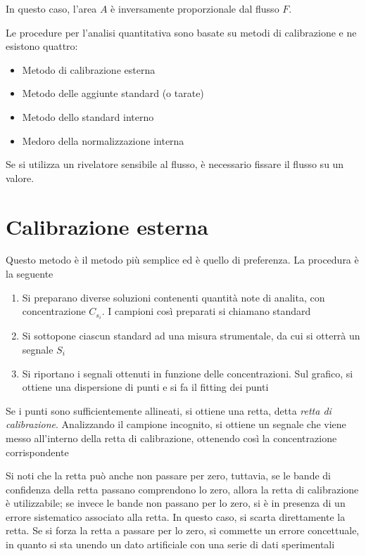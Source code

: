 In questo caso, l'area $A$ è inversamente proporzionale dal flusso $F$.

Le procedure per l'analisi quantitativa sono basate su metodi di calibrazione e ne esistono quattro:
\begin{itemize}
\item Metodo di calibrazione esterna
\item Metodo delle aggiunte standard (o tarate)
\item Metodo dello standard interno
\item Medoro della normalizzazione interna
\end{itemize}
Se si utilizza un rivelatore sensibile al flusso, è necessario fissare il flusso su un valore.

\section{Calibrazione esterna}
Questo metodo è il metodo più semplice ed è quello di preferenza. La procedura è la seguente
\begin{enumerate}
\item Si preparano diverse soluzioni contenenti quantità note di analita, con concentrazione $C_{s_i}$. I campioni così preparati si chiamano standard
\item Si sottopone ciascun standard ad una misura strumentale, da cui si otterrà un segnale $S_i$
\item Si riportano i segnali ottenuti in funzione delle concentrazioni. Sul grafico, si ottiene una dispersione di punti e si fa il fitting dei punti
\end{enumerate}

Se i punti sono sufficientemente allineati, si ottiene una retta, detta \emph{retta di calibrazione}.
Analizzando il campione incognito, si ottiene un segnale che viene messo all'interno della retta di calibrazione, ottenendo così la concentrazione corrispondente


Si noti che la retta può anche non passare per zero, tuttavia, se le bande di confidenza della retta passano comprendono lo zero, allora la retta di calibrazione è utilizzabile;
se invece le bande non passano per lo zero, si è in presenza di un errore sistematico associato alla retta. In questo caso, si scarta direttamente la retta.
Se si forza la retta a passare per lo zero, si commette un errore concettuale, in quanto si sta unendo un dato artificiale con una serie di dati sperimentali


